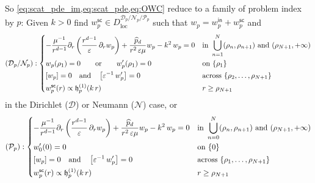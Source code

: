\documentclass[12pt,a4paper]{article}
\theoremstyle{definition}
\theoremstyle{plain}
\theoremstyle{remark}
\newcommand{\calD}{\mathcal{D}}
\newcommand{\calN}{\mathcal{N}}
\newcommand{\calP}{\mathcal{P}}
\newcommand{\frh}{\mathop{}\!\mathfrak{h}^{(1)}}
\newcommand{\plr}[1]{\left(#1\right)}
\newcommand{\clr}[1]{\left[#1\right]}
\newcommand{\eps}{\varepsilon}
\newcommand{\loc}{\mathrm{loc}}
\newcommand{\inc}{\mathsf{in}}
\newcommand{\sca}{\mathsf{sc}}
\begin{document}
So \cref{eq:scat_pde_im,eq:scat_pde,eq:OWC} reduce to a family of problem index by \(p\): Given \(k > 0\) find \(w_p^\sca \in D^{\calD_p/\calN_p/\calP_p}_\loc\) such that \(w_p = w_p^\inc + w_p^\sca\) and
\begin{equation}
    (\calD_p/\calN_p) : \begin{dcases}
        -\frac{\mu^{-1}}{r^{d-1}} \partial_r\plr{\frac{r^{d-1}}{\eps}\, \partial_r w_p} + \dfrac{\widehat{p}_d}{r^2\, \eps\mu} w_p - k^2\, w_p = 0 & \text{in } \bigcup_{n=1}^N (\rho_n, \rho_{n+1}) \text{ and } (\rho_{N+1}, +\infty) \\
        w_p(\rho_1) = 0 \qquad \text{or} \qquad w_p'(\rho_1) = 0                                                                                   & \text{on } \{\rho_1\}                                                              \\
        \clr{w_p} = 0 \quad\text{and}\quad \clr{\eps^{-1}\, w_p'} = 0                                                                              & \text{across } \{\rho_2, \ldots, \rho_{N+1}\}                                      \\
        w_p^\sca(r) \propto \frh_p(k\, r)                                                                                                          & r \ge \rho_{N+1}
    \end{dcases}
\end{equation}
in the Dirichlet ($\calD$) or Neumann ($\calN$) case, or
\begin{equation}
    (\calP_p) : \begin{dcases}
        -\frac{\mu^{-1}}{r^{d-1}} \partial_r\plr{\frac{r^{d-1}}{\eps}\, \partial_r w_p} + \dfrac{\widehat{p}_d}{r^2\, \eps\mu} w_p - k^2\, w_p = 0 & \text{in } \bigcup_{n=0}^N (\rho_n, \rho_{n+1}) \text{ and } (\rho_{N+1}, +\infty) \\
        w_0'(0) = 0                                                                                                                                & \text{on } \{0\}                                                                   \\
        \clr{w_p} = 0 \quad\text{and}\quad \clr{\eps^{-1}\, w_p'} = 0                                                                              & \text{across } \{\rho_1, \ldots, \rho_{N+1}\}                                      \\
        w_p^\sca(r) \propto \frh_p(k\, r)                                                                                                          & r \ge \rho_{N+1}
    \end{dcases}
\end{equation}
\end{document}
